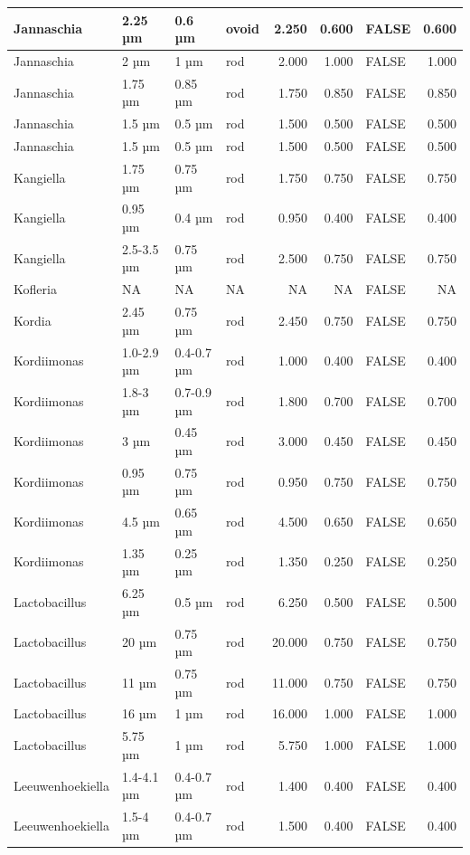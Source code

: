 \documentclass[
]{article}
\begin{document}
\begin{table}
\begin{tabular}{l|l|l|l|r|r|l|r}
\hline
Jannaschia & 2.25 µm & 0.6 µm & ovoid & 2.250 & 0.600 & FALSE & 0.600\\
\hline
Jannaschia & 2 µm & 1 µm & rod & 2.000 & 1.000 & FALSE & 1.000\\
\hline
Jannaschia & 1.75 µm & 0.85 µm & rod & 1.750 & 0.850 & FALSE & 0.850\\
\hline
Jannaschia & 1.5 µm & 0.5 µm & rod & 1.500 & 0.500 & FALSE & 0.500\\
\hline
Jannaschia & 1.5 µm & 0.5 µm & rod & 1.500 & 0.500 & FALSE & 0.500\\
\hline
Kangiella & 1.75 µm & 0.75 µm & rod & 1.750 & 0.750 & FALSE & 0.750\\
\hline
Kangiella & 0.95 µm & 0.4 µm & rod & 0.950 & 0.400 & FALSE & 0.400\\
\hline
Kangiella & 2.5-3.5 µm & 0.75 µm & rod & 2.500 & 0.750 & FALSE & 0.750\\
\hline
Kofleria & NA & NA & NA & NA & NA & FALSE & NA\\
\hline
Kordia & 2.45 µm & 0.75 µm & rod & 2.450 & 0.750 & FALSE & 0.750\\
\hline
Kordiimonas & 1.0-2.9 µm & 0.4-0.7 µm & rod & 1.000 & 0.400 & FALSE & 0.400\\
\hline
Kordiimonas & 1.8-3 µm & 0.7-0.9 µm & rod & 1.800 & 0.700 & FALSE & 0.700\\
\hline
Kordiimonas & 3 µm & 0.45 µm & rod & 3.000 & 0.450 & FALSE & 0.450\\
\hline
Kordiimonas & 0.95 µm & 0.75 µm & rod & 0.950 & 0.750 & FALSE & 0.750\\
\hline
Kordiimonas & 4.5 µm & 0.65 µm & rod & 4.500 & 0.650 & FALSE & 0.650\\
\hline
Kordiimonas & 1.35 µm & 0.25 µm & rod & 1.350 & 0.250 & FALSE & 0.250\\
\hline
Lactobacillus & 6.25 µm & 0.5 µm & rod & 6.250 & 0.500 & FALSE & 0.500\\
\hline
Lactobacillus & 20 µm & 0.75 µm & rod & 20.000 & 0.750 & FALSE & 0.750\\
\hline
Lactobacillus & 11 µm & 0.75 µm & rod & 11.000 & 0.750 & FALSE & 0.750\\
\hline
Lactobacillus & 16 µm & 1 µm & rod & 16.000 & 1.000 & FALSE & 1.000\\
\hline
Lactobacillus & 5.75 µm & 1 µm & rod & 5.750 & 1.000 & FALSE & 1.000\\
\hline
Leeuwenhoekiella & 1.4-4.1 µm & 0.4-0.7 µm & rod & 1.400 & 0.400 & FALSE & 0.400\\
\hline
Leeuwenhoekiella & 1.5-4 µm & 0.4-0.7 µm & rod & 1.500 & 0.400 & FALSE & 0.400\\

\end{tabular}
\end{table}
\end{document}
